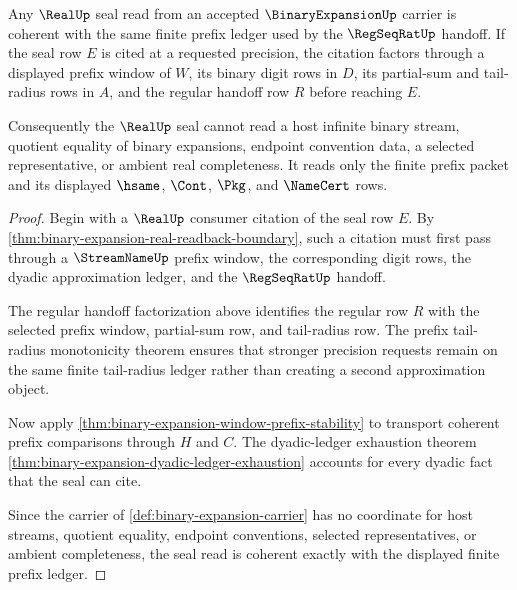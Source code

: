 \begin{theorem}
\label{thm:binary-expansion-real-seal-prefix-coherence}
Any $\RealUp$ seal read from an accepted $\BinaryExpansionUp$ carrier is coherent with the same finite prefix ledger used by the $\RegSeqRatUp$ handoff. If the seal row $E$ is cited at a requested precision, the citation factors through a displayed prefix window of $W$, its binary digit rows in $D$, its partial-sum and tail-radius rows in $A$, and the regular handoff row $R$ before reaching $E$.

Consequently the $\RealUp$ seal cannot read a host infinite binary stream, quotient equality of binary expansions, endpoint convention data, a selected representative, or ambient real completeness. It reads only the finite prefix packet and its displayed $\hsame$, $\Cont$, $\Pkg$, and $\NameCert$ rows.
\end{theorem}
\begin{proof}
Begin with a $\RealUp$ consumer citation of the seal row $E$. By \autoref{thm:binary-expansion-real-readback-boundary}, such a citation must first pass through a $\StreamNameUp$ prefix window, the corresponding digit rows, the dyadic approximation ledger, and the $\RegSeqRatUp$ handoff.

The regular handoff factorization above identifies the regular row $R$ with the selected prefix window, partial-sum row, and tail-radius row. The prefix tail-radius monotonicity theorem ensures that stronger precision requests remain on the same finite tail-radius ledger rather than creating a second approximation object.

Now apply \autoref{thm:binary-expansion-window-prefix-stability} to transport coherent prefix comparisons through $H$ and $C$. The dyadic-ledger exhaustion theorem \autoref{thm:binary-expansion-dyadic-ledger-exhaustion} accounts for every dyadic fact that the seal can cite.

Since the carrier of \autoref{def:binary-expansion-carrier} has no coordinate for host streams, quotient equality, endpoint conventions, selected representatives, or ambient completeness, the seal read is coherent exactly with the displayed finite prefix ledger.
\end{proof}

